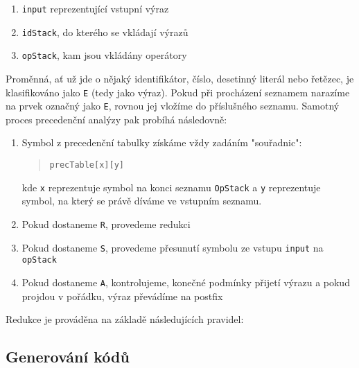 \documentclass[czech,a4paper,12pt]{article}[]
\begin{document}
\begin{enumerate}
    \item \texttt{input} reprezentující vstupní výraz
    \item \texttt{idStack}, do kterého se vkládají výrazů
    \item \texttt{opStack}, kam jsou vkládány operátory
\end{enumerate} 

\medskip
Proměnná, ať už jde o nějaký identifikátor, číslo, desetinný literál nebo řetězec, je klasifikováno jako \texttt{E} (tedy jako výraz). Pokud při procházení seznamem narazíme na prvek označný jako \texttt{E}, rovnou jej vložíme do příslušného seznamu. Samotný proces precedenční analýzy pak probíhá následovně:

\begin{enumerate}
\item Symbol z precedenční tabulky získáme vždy zadáním "souřadnic":
\begin{quote}
\texttt{precTable[x][y]}
\end{quote}
kde \texttt{x} reprezentuje symbol na konci seznamu \texttt{OpStack} a \texttt{y} reprezentuje symbol, na který se právě díváme ve vstupním seznamu.
\item Pokud dostaneme \texttt{R}, provedeme redukci
\item Pokud dostaneme \texttt{S}, provedeme přesunutí symbolu ze vstupu \texttt{input} na \texttt{opStack}
\item Pokud dostaneme \texttt{A}, kontrolujeme, konečné podmínky přijetí výrazu a pokud projdou v pořádku, výraz převádíme na postfix
\end{enumerate}

\medskip
Redukce je prováděna na základě následujících pravidel:

\begin{center}
\end{center}



\subsection{Generování kódů}
\end{document}
